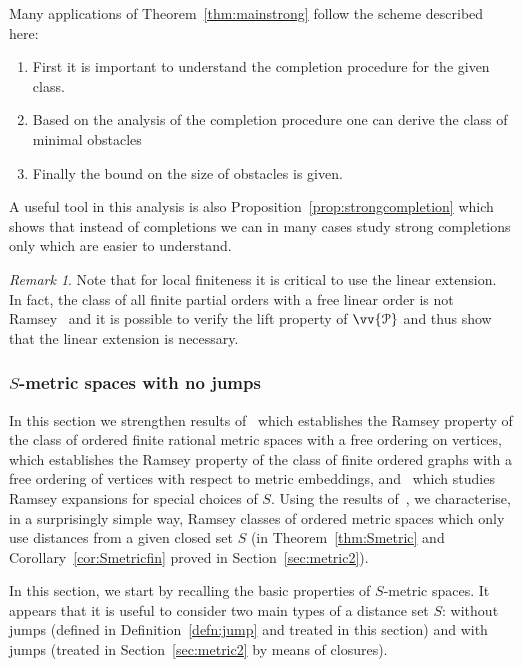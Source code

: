 \documentclass{elsarticle}
\def\ordclass#1{\vv{#1}}
\theoremstyle{plain}
\theoremstyle{definition}
\theoremstyle{remark}
\newtheorem*{remark}{Remark}
\begin{document}
Many applications of Theorem~\ref{thm:mainstrong} follow the scheme described here:
\begin{enumerate}
\item First it is important to understand the completion procedure for the given class.
\item Based on the analysis of the completion procedure one can derive the class of minimal obstacles
\item Finally the bound on the size of obstacles is given. 
\end{enumerate}
A useful tool in this analysis is also Proposition~\ref{prop:strongcompletion}
which shows that instead of completions we can in many cases study strong completions only which
are easier to understand.

\begin{remark}
Note that for local finiteness it is critical to use the linear extension.
In fact, the class of all finite partial orders with a free linear order is not Ramsey~\cite{Fouche1997} and it is possible
to verify the lift property of $\ordclass{\mathcal P}$ and thus show that the
linear extension is necessary.
\end{remark}
\subsubsection {$S$-metric spaces with no jumps}
\label{sec:metric}
In this section we strengthen results of~\cite{Nevsetvril2007} which establishes the Ramsey
property of the class of ordered finite rational metric spaces with a free ordering on vertices, \cite{Dellamonica2012} which establishes the Ramsey property of the class of finite ordered graphs with a free ordering of vertices with respect to metric embeddings, and~\cite{The2010} which studies Ramsey expansions for special choices of $S$.
Using the results of~\cite{Sauer2013}, we characterise, in a surprisingly simple way, Ramsey classes of ordered metric spaces which only use distances from a given closed set $S$ (in Theorem~\ref{thm:Smetric} and Corollary~\ref{cor:Smetricfin} proved in Section~\ref{sec:metric2}).

In this section,
we start by recalling the basic properties of $S$-metric spaces. It appears that it is useful to consider two main types of a distance set $S$: without jumps (defined in Definition~\ref{defn:jump} and treated in this section) and with jumps (treated in Section~\ref{sec:metric2} by means of closures).
\end{document}
